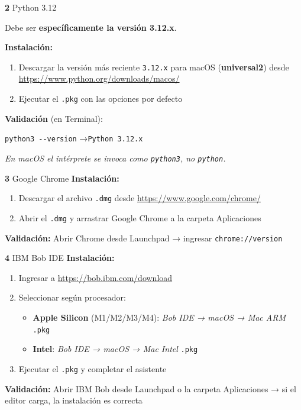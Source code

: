 \documentclass[11pt, a4paper]{article}
\newcommand{\version}[1]{\texttt{\textcolor{ibmblue}{#1}}}
\newcommand{\cmd}[1]{\texttt{\textcolor{ibmdark}{\small #1}}}
\newcommand{\checkmark}{\textcolor{ibmgreen}{\faCheckCircle}}
\begin{document}
\vspace{6pt}
\begin{labbox}[ibmdark]{\textbf{2} \quad Python 3.12}
\begin{criticalbox}
  Debe ser \textbf{específicamente la versión 3.12.x}.
\end{criticalbox}
\vspace{6pt}
\textbf{Instalación:}
\begin{enumerate}[leftmargin=*, nosep]
  \item Descargar la versión más reciente \version{3.12.x} para macOS (\textbf{universal2}) desde \url{https://www.python.org/downloads/macos/}
  \item Ejecutar el \texttt{.pkg} con las opciones por defecto
\end{enumerate}
\vspace{4pt}
\textbf{Validación} (en Terminal):
\begin{center}
  \cmd{python3 -{}-version} \quad→\quad \version{Python 3.12.x} \checkmark
\end{center}
\textit{En macOS el intérprete se invoca como \cmd{python3}, no \cmd{python}.}
\end{labbox}

\vspace{6pt}
\begin{labbox}[ibmdark]{\textbf{3} \quad Google Chrome}
\textbf{Instalación:}
\begin{enumerate}[leftmargin=*, nosep]
  \item Descargar el archivo \texttt{.dmg} desde \url{https://www.google.com/chrome/}
  \item Abrir el \texttt{.dmg} y arrastrar Google Chrome a la carpeta Aplicaciones
\end{enumerate}
\vspace{4pt}
\textbf{Validación:} Abrir Chrome desde Launchpad → ingresar \cmd{chrome://version} \checkmark
\end{labbox}

\vspace{6pt}
\begin{labbox}[ibmblue]{\textbf{4} \quad IBM Bob IDE}
\textbf{Instalación:}
\begin{enumerate}[leftmargin=*, nosep]
  \item Ingresar a \url{https://bob.ibm.com/download}
  \item Seleccionar según procesador:
    \begin{itemize}[nosep]
      \item \textbf{Apple Silicon} (M1/M2/M3/M4): \emph{Bob IDE → macOS → Mac ARM} \quad \texttt{.pkg}
      \item \textbf{Intel}: \emph{Bob IDE → macOS → Mac Intel} \quad \texttt{.pkg}
    \end{itemize}
  \item Ejecutar el \texttt{.pkg} y completar el asistente
\end{enumerate}
\vspace{4pt}
\textbf{Validación:} Abrir IBM Bob desde Launchpad o la carpeta Aplicaciones → si el editor carga, la instalación es correcta \checkmark
\end{labbox}
\end{document}
